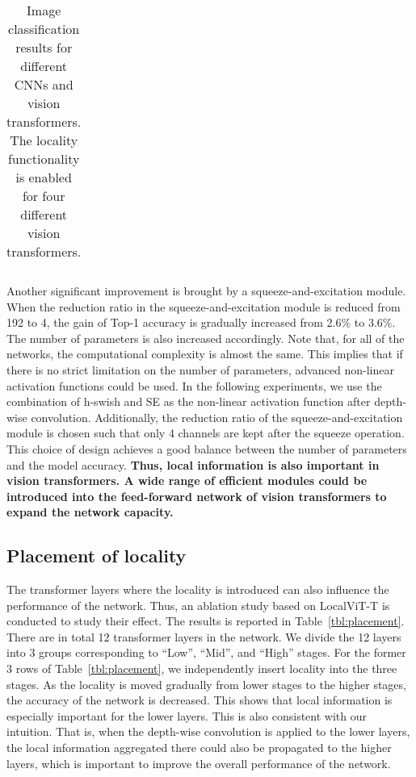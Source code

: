 \documentclass[10pt,twocolumn,letterpaper]{article}
\begin{document}
\begin{table*}[!t]
\begin{center}
\begin{tabular}{l|r|r|c|l|c}
        \end{tabular}
    \end{center}
    \vspace{-0.2cm}
    \caption{Image classification results for different CNNs and vision transformers. The locality functionality is enabled for four different vision transformers.}
    \label{tbl:generalization_results}
\end{table*}


Another significant improvement is brought by a squeeze-and-excitation module. When the reduction ratio in the squeeze-and-excitation module is reduced from 192 to 4, the gain of Top-1 accuracy is gradually increased from 2.6\% to 3.6\%. The number of parameters is also increased accordingly. Note that, for all of the networks, the computational complexity is almost the same. This implies that if there is no strict limitation on the number of parameters, advanced non-linear activation functions could be used. In the following experiments, we use the combination of h-swish and SE as the non-linear activation function after depth-wise convolution. Additionally, the reduction ratio of the squeeze-and-excitation module is chosen such that only 4 channels are kept after the squeeze operation. This choice of design achieves a good balance between the number of parameters and the model accuracy.
\textbf{Thus, local information is also important in vision transformers. A wide range of efficient modules could be introduced into the feed-forward network of vision transformers to expand the network capacity.}


\subsection{Placement of locality}
The transformer layers where the locality is introduced can also influence the performance of the network. Thus, an ablation study based on LocalViT-T is conducted to study their effect. The results is reported in Table~\ref{tbl:placement}. There are in total 12 transformer layers in the network. We divide the 12 layers into 3 groups corresponding to ``Low'', ``Mid'', and ``High'' stages. For the former 3 rows of Table~\ref{tbl:placement}, we independently insert locality into the three stages. As the locality is moved gradually from lower stages to the higher stages, the accuracy of the network is decreased. This shows that local information is especially important for the lower layers. This is also consistent with our intuition. That is, when the depth-wise convolution is applied to the lower layers, the local information aggregated there could also be propagated to the higher layers, which is important to improve the overall performance of the network. 
\end{document}
